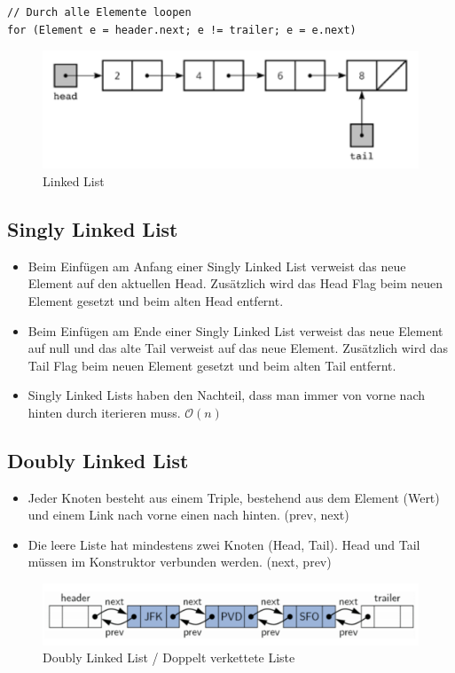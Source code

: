 \begin{lstlisting}
// Durch alle Elemente loopen
for (Element e = header.next; e != trailer; e = e.next)
\end{lstlisting}

\begin{figure}[h!]
	\centering
	\includegraphics[width=0.5\linewidth]{images/linked_list}
	\caption{Linked List}
\end{figure}

\subsection{Singly Linked List}
\begin{itemize}
	\item Beim Einfügen am Anfang einer Singly Linked List verweist das neue Element auf den aktuellen Head. Zusätzlich wird das Head Flag beim neuen Element gesetzt und beim alten Head entfernt.
	\item Beim Einfügen am Ende einer Singly Linked List verweist das neue Element auf null und das alte Tail verweist auf das neue Element. Zusätzlich wird das Tail Flag beim neuen Element gesetzt und beim alten Tail entfernt.
	\item Singly Linked Lists haben den Nachteil, dass man immer von vorne nach hinten durch iterieren muss. $\mathcal{O}(n)$
\end{itemize}

\subsection{Doubly Linked List}
\begin{itemize}
	\item Jeder Knoten besteht aus einem Triple, bestehend aus dem Element (Wert) und einem Link nach vorne einen nach hinten. (prev, next)
	\item Die leere Liste hat mindestens zwei Knoten (Head, Tail). Head und Tail müssen im Konstruktor verbunden werden.  (next, prev)
\end{itemize}

\begin{figure}[h]
	\centering
	\includegraphics[width=0.5\linewidth]{images/doubly_linked_list}
	\caption{Doubly Linked List / Doppelt verkettete Liste}
\end{figure}

